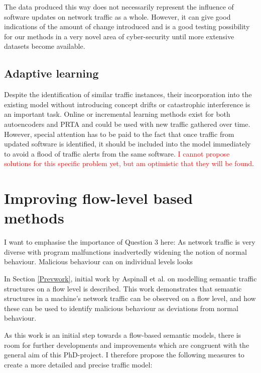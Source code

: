 \documentclass[a4paper,12pt,twoside]{report}
\begin{document}
The data produced this way does not necessarily represent the influence of software updates on network traffic as a whole. However, it can give good indications of the amount of change introduced and is a good testing possibility for our methods in a very novel area of cyber-security until more extensive datasets become available. 

\subsection{Adaptive learning}
Despite the identification of similar traffic instances, their incorporation into the existing model without introducing concept drifts or catastrophic interference is an important task. Online or incremental learning methods exist for both autoencoders and PRTA and could be used with new traffic gathered over time. However, special attention has to be paid to the fact that once traffic from updated software is identified, it should be included into the model immediately to avoid a flood of traffic alerts from the same software. \textcolor{red}{I cannot propose solutions for this specific problem yet, but am optimistic that they will be found}.

\section{Improving flow-level based methods}\label{Curmet}


I want to emphasise the importance of Question 3 here: As network traffic is very diverse with program malfunctions inadvertedly widening the notion of normal behaviour. Malicious behaviour can on individual levels looks



In Section \ref{Prevwork}, initial work by Aspinall et al. on modelling semantic traffic structures on a flow level is described. This work demonstrates that semantic structures in a machine's network traffic can be observed on a flow level, and how these can be used to identify malicious behaviour as deviations from normal behaviour.

As this work is an initial step towards a flow-based semantic models, there is room for further developments and improvements which are congruent  with the general aim of this PhD-project. I therefore propose the following measures to create a more detailed and precise traffic model:
\end{document}
